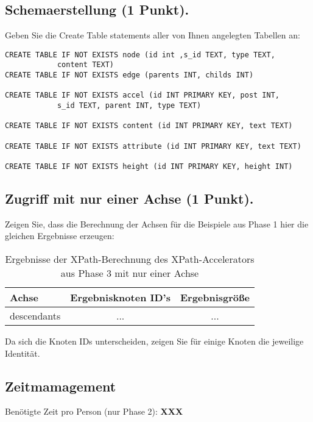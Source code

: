 \documentclass[11pt]{scrartcl}
\begin{document}
\subsection*{Schemaerstellung (1 Punkt).}
Geben Sie die Create Table statements aller von Ihnen angelegten Tabellen an:
\begin{lstlisting}[style=dmrsql]
CREATE TABLE IF NOT EXISTS node (id int ,s_id TEXT, type TEXT,
			content TEXT)
CREATE TABLE IF NOT EXISTS edge (parents INT, childs INT)

CREATE TABLE IF NOT EXISTS accel (id INT PRIMARY KEY, post INT,
			s_id TEXT, parent INT, type TEXT)

CREATE TABLE IF NOT EXISTS content (id INT PRIMARY KEY, text TEXT)

CREATE TABLE IF NOT EXISTS attribute (id INT PRIMARY KEY, text TEXT)

CREATE TABLE IF NOT EXISTS height (id INT PRIMARY KEY, height INT)
\end{lstlisting}

\subsection*{Zugriff mit nur einer Achse (1 Punkt).}
Zeigen Sie, dass die Berechnung der Achsen für die Beispiele aus Phase 1 hier die gleichen Ergebnisse erzeugen:

\begin{table}[h]
	\centering
		\begin{center}
			\begin{tabular}{ l | c c }
				\toprule
				Achse & Ergebnisknoten ID's & Ergebnisgröße\\
				\midrule
				descendants & ... & ... \\  
				\bottomrule
			\end{tabular}
			\end{center}
	\caption{Ergebnisse der XPath-Berechnung des XPath-Accelerators aus Phase 3 mit nur einer Achse}
	\label{tab:ErgebnisseDerXPathBerechnug}
\end{table}

Da sich die Knoten IDs unterscheiden, zeigen Sie für einige Knoten die jeweilige Identität.

\subsection*{Zeitmamagement}

Benötigte Zeit pro Person (nur Phase 2): \textbf{XXX}
\end{document}
